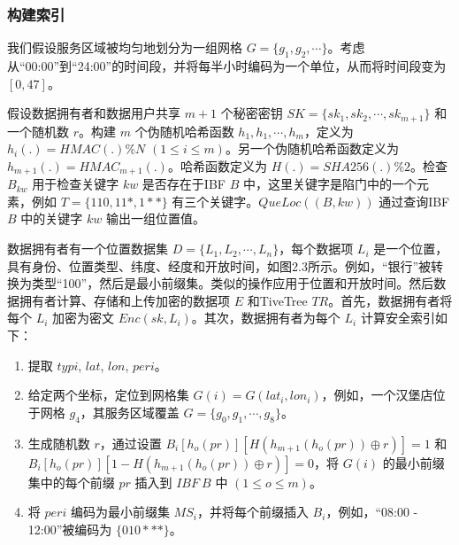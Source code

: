 \documentclass{cumcmthesis}
\numberwithin{equation}{section} %
\numberwithin{figure}{section} %
\numberwithin{table}{section} %
\begin{document}
\subsubsection{构建索引}
我们假设服务区域被均匀地划分为一组网格 $G = \{g_1, g_2, \cdots\}$。考虑从“00:00”到“24:00”的时间段，并将每半小时编码为一个单位，从而将时间段变为 $[0, 47]$。

假设数据拥有者和数据用户共享 $m + 1$ 个秘密密钥 $SK = \{sk_1, sk_2, \cdots, sk_{m + 1}\}$ 和一个随机数 $r$。构建 $m$ 个伪随机哈希函数 $h_1, h_1, \cdots, h_m$，定义为 $h_i(.) = HMAC(.) \% N$ $(1 \leq i \leq m)$。另一个伪随机哈希函数定义为 $h_{m + 1}(.) = HMAC_{m + 1}(.)$。哈希函数定义为 $H(.) = SHA256(.) \% 2$。检查 $B_{kw}$ 用于检查关键字 $kw$ 是否存在于IBF $B$ 中，这里关键字是陷门中的一个元素，例如 $T = \{110, 11 *, 1 * *\}$ 有三个关键字。$QueLoc((B, kw))$ 通过查询IBF $B$ 中的关键字 $kw$ 输出一组位置值。

数据拥有者有一个位置数据集 $D = \{L_1, L_2, \cdots, L_n\}$，每个数据项 $L_i$ 是一个位置，具有身份、位置类型、纬度、经度和开放时间，如图2.3所示。例如，“银行”被转换为类型“100”，然后是最小前缀集。类似的操作应用于位置和开放时间。然后数据拥有者计算、存储和上传加密的数据项 $E$ 和TiveTree $TR$。首先，数据拥有者将每个 $L_i$ 加密为密文 $Enc(sk, L_i)$。其次，数据拥有者为每个 $L_i$ 计算安全索引如下：
\begin{enumerate}
    \item 提取 $typi$, $lat$, $lon$, $peri$。
    \item 给定两个坐标，定位到网格集 $G(i) = G(lat_i, lon_i)$，例如，一个汉堡店位于网格 $g_4$，其服务区域覆盖 $G = \{g_0, g_1, \cdots, g_8\}$。
    \item 生成随机数 $r$，通过设置 $B_{i}[h_o(pr)][H(h_{m + 1}(h_o(pr)) \oplus r)] = 1$ 和 $B_{i}[h_o(pr)][1 - H(h_{m + 1}(h_o(pr)) \oplus r)] = 0$，将 $G(i)$ 的最小前缀集中的每个前缀 $pr$ 插入到 $IBF\ B$ 中 $(1 \leq o \leq m)$。
    \item 将 $peri$ 编码为最小前缀集 $MS_i$，并将每个前缀插入 $B_i$，例如，“08:00 - 12:00”被编码为 $\{010***\}$。
\end{enumerate}
\end{document}
